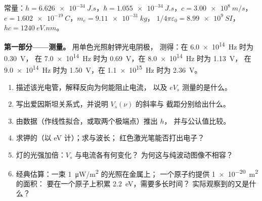 \begin{problem}
\label{pb:b1:quantum-introduction:1}
常量：$h = \qty{6.626e-34}{J.s}$，$\hbar = \qty{1.055e-34}{J.s}$，$c =
\qty{3.00e8}{m/s}$，$e = \qty{1.602e-19}{C}$，$m_e = \qty{9.11e-31}{kg}$，
$1/4\pi\varepsilon_0 = \qty{8.99e9}{SI}$，$hc = \qty{1240}{eV.nm}$。

\medskip
\noindent\textbf{第一部分——测量。}
用单色光照射钾光电阴极，
测得：在 \qty{6.0e14}{Hz} 时为 \qty{0.30}{V}，
在 \qty{7.0e14}{Hz} 时为 \qty{0.69}{V}，在 \qty{8.0e14}{Hz} 时为 \qty{1.13}{V}，
在 \qty{9.0e14}{Hz} 时为 \qty{1.50}{V}，在 \qty{1.1e15}{Hz} 时为 \qty{2.36}{V}。
\begin{enumerate}
  \item 描述该光电管，解释反向为何能阻止电流，
        以及 $eV_s$ 测量的是什么。
  \item 写出爱因斯坦关系式，并说明 $V_s(\nu)$ 的斜率与
        截距分别给出什么。
  \item 由数据（作线性拟合，或取两个极端点）推出 $h$，
        并与公认值比较。
  \item 求钾的（以 eV 计）；求与波长；
        红色激光笔能否打出电子？
  \item 灯的光强加倍：$V_s$ 与电流各有何变化？
        为何这与纯波动图像不相容？
  \item 经典估算：一束 \qty{1}{\micro W/m^2} 的光照在金属上；
        一个原子约提供 \qty{1e-20}{m^2} 的面积：
        要在一个原子上积累 \qty{2.2}{eV}，需要多长时间？
        实际观察到的又是什么？
\end{enumerate}


\end{problem}
